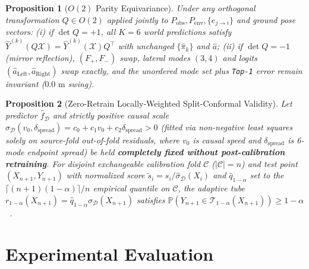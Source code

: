 \documentclass[journal]{IEEEtran}
\newtheorem{proposition}{Proposition}
\begin{document}
\begin{proposition}[$O(2)$ Parity Equivariance]
Under any orthogonal transformation $Q \in O(2)$ applied jointly to $P_{\text{obs}}, P_{\text{env}}, \{e_{j\to i}\}$ and ground pose vectors: (i) if $\det Q = +1$, all $K=6$ world predictions satisfy $\hat{Y}^{(k)}(Q\mathcal{X}) = \hat{Y}^{(k)}(\mathcal{X}) Q^\top$ with unchanged $\{\hat{\pi}_k\}$ and $\hat{a}$; (ii) if $\det Q = -1$ (mirror reflection), $(F_+, F_-)$ swap, lateral modes $(3, 4)$ and logits $(\hat{a}_{\text{Left}}, \hat{a}_{\text{Right}})$ swap exactly, and the unordered mode set plus \texttt{Top-1} error remain invariant ($0.0\text{ m}$ swing).
\end{proposition}

\begin{proposition}[Zero-Retrain Locally-Weighted Split-Conformal Validity]
Let predictor $\hat{f}_{\mathcal{D}}$ and strictly positive causal scale $\hat{\sigma}_{\mathcal{D}}(v_0, \delta_{\text{spread}}) = c_0 + c_1 v_0 + c_2 \delta_{\text{spread}} > 0$ (fitted via non-negative least squares solely on source-fold out-of-fold residuals, where $v_0$ is causal speed and $\delta_{\text{spread}}$ is 6-mode endpoint spread) be held \textbf{completely fixed without post-calibration retraining}. For disjoint exchangeable calibration fold $\mathcal{C}$ ($|\mathcal{C}|=n$) and test point $(X_{n+1}, Y_{n+1})$ with normalized score $\tilde{s}_i = s_i / \hat{\sigma}_{\mathcal{D}}(X_i)$ and $\hat{q}_{1-\alpha}$ set to the $\lceil (n+1)(1-\alpha) \rceil / n$ empirical quantile on $\mathcal{C}$, the adaptive tube $r_{1-\alpha}(X_{n+1}) = \hat{q}_{1-\alpha}\hat{\sigma}_{\mathcal{D}}(X_{n+1})$ satisfies $\mathbb{P}(Y_{n+1} \in \mathcal{T}_{1-\alpha}(X_{n+1})) \ge 1 - \alpha$~\cite{lei2018conformal,lindemann2023conformal}.
\end{proposition}

\section{Experimental Evaluation}
\end{document}

